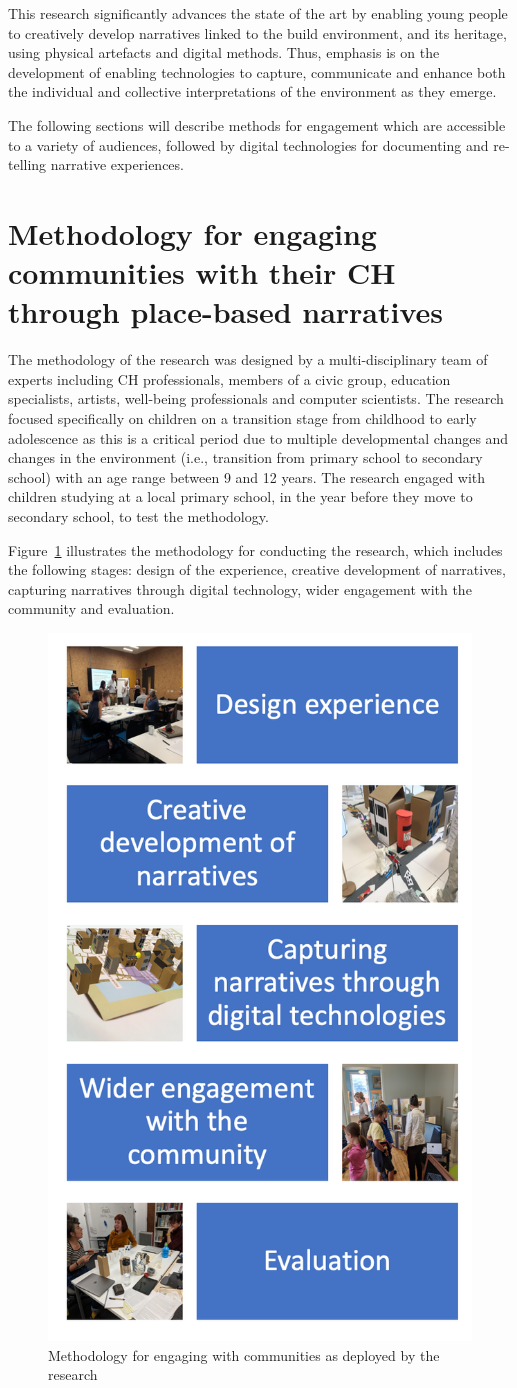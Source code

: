\documentclass[acmlarge,screen,dvipsnames]{acmart}
\begin{document}
This research significantly advances the state of the art by enabling young people to creatively develop narratives linked to the build environment, and its heritage, using physical artefacts and digital methods. Thus, emphasis is on the
development of enabling technologies to capture, communicate and enhance both the individual and collective interpretations of the environment as they emerge.

The following sections will describe methods for engagement which are
accessible to a variety of audiences, followed by digital technologies for
documenting and re-telling narrative experiences. 
\section{Methodology for engaging communities with their CH through place-based narratives} 
\label{meth} The methodology of the research was designed by
a multi-disciplinary team of experts including CH
professionals, members of a civic group, education specialists, artists,
well-being professionals and computer scientists. The
research focused specifically on children on a transition stage from childhood to early adolescence as this is a critical period due to multiple developmental changes and changes in the environment (i.e., transition from primary school to secondary school) with an age range between 9 and  12 years. The research engaged with children studying at a local primary school, in the year before they move to secondary school,  to test the methodology.
\color{black}


Figure~\ref{fig:method} illustrates the methodology for conducting the
research, which includes the following stages: design of the experience,
creative development of narratives, capturing narratives through digital
technology, wider engagement with the community and evaluation.


\begin{figure}[h]
  \centering
  \includegraphics[width=0.5\linewidth]{images/method}
\caption{Methodology for engaging with communities as deployed by the research}
\label{fig:method}
\end{figure}
\end{document}
